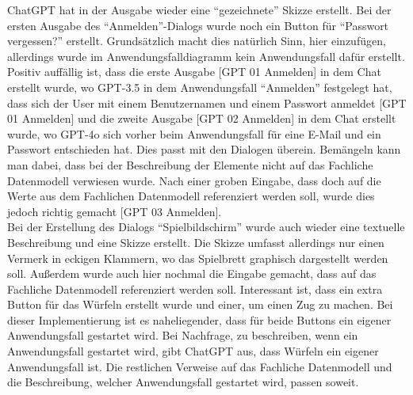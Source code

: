 ChatGPT hat in der Ausgabe wieder eine ``gezeichnete'' Skizze erstellt. Bei der ersten Ausgabe des ``Anmelden''-Dialogs wurde noch ein Button 
für ``Passwort vergessen?'' erstellt. Grundsätzlich macht dies natürlich Sinn, hier einzufügen, allerdings wurde im Anwendungsfalldiagramm 
kein Anwendungsfall dafür erstellt. Positiv auffällig ist, dass die erste Ausgabe [GPT 01 Anmelden] in dem Chat erstellt wurde, wo GPT-3.5 
in dem Anwendungsfall ``Anmelden'' festgelegt hat, dass sich der User mit einem Benutzernamen und einem Passwort anmeldet [GPT 01 Anmelden] 
und die zweite Ausgabe [GPT 02 Anmelden] in dem Chat erstellt wurde, wo GPT-4o sich vorher beim Anwendungsfall für eine E-Mail und ein 
Passwort entschieden hat. Dies passt mit den Dialogen überein. Bemängeln kann man dabei, dass bei der Beschreibung der Elemente nicht auf 
das Fachliche Datenmodell verwiesen wurde. Nach einer groben Eingabe, dass doch auf die Werte aus dem Fachlichen Datenmodell referenziert 
werden soll, wurde dies jedoch richtig gemacht [GPT 03 Anmelden].\\
Bei der Erstellung des Dialogs ``Spielbildschirm'' wurde auch wieder eine textuelle Beschreibung und eine Skizze erstellt. Die Skizze umfasst 
allerdings nur einen Vermerk in eckigen Klammern, wo das Spielbrett graphisch dargestellt werden soll. Außerdem wurde auch hier nochmal die 
Eingabe gemacht, dass auf das Fachliche Datenmodell referenziert werden soll. Interessant ist, dass ein extra Button für das Würfeln erstellt 
wurde und einer, um einen Zug zu machen. Bei dieser Implementierung ist es naheliegender, dass für beide Buttons ein eigener Anwendungsfall 
gestartet wird. Bei Nachfrage, zu beschreiben, wenn ein Anwendungsfall gestartet wird, gibt ChatGPT aus, dass Würfeln ein eigener 
Anwendungsfall ist. Die restlichen Verweise auf das Fachliche Datenmodell und die Beschreibung, welcher Anwendungsfall gestartet wird, 
passen soweit.

